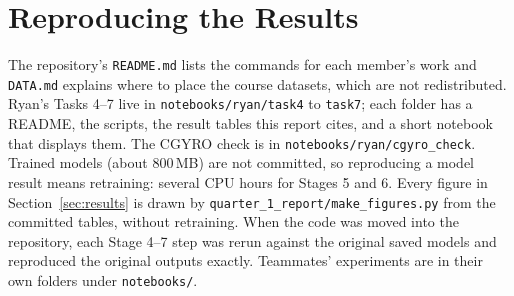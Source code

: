 \documentclass[12pt,letterpaper]{article}
\begin{document}
\section{Reproducing the Results}
\label{app:repro}

The repository's \texttt{README.md} lists the commands for each member's work and
\texttt{DATA.md} explains where to place the course datasets, which are not
redistributed. Ryan's Tasks 4--7 live in \texttt{notebooks/ryan/task4} to
\texttt{task7}; each folder has a README, the scripts, the result tables this report cites,
and a short notebook that displays them. The CGYRO check is in
\texttt{notebooks/ryan/cgyro\_check}. Trained models (about 800\,MB) are not committed, so
reproducing a model result means retraining: several CPU hours for Stages 5 and 6. Every
figure in Section~\ref{sec:results} is drawn by \texttt{quarter\_1\_report/make\_figures.py} from the
committed tables, without retraining. When the code was moved into the repository, each
Stage 4--7 step was rerun against the original saved models and reproduced the original
outputs exactly. Teammates' experiments are in their own folders under \texttt{notebooks/}.
\end{document}
